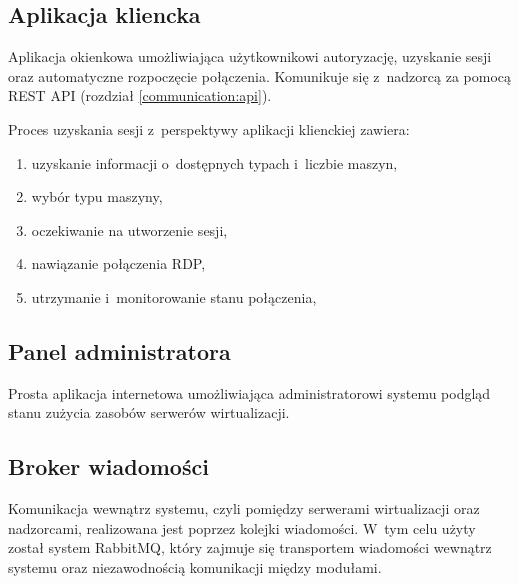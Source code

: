 \documentclass[../opis-rozwiazania.tex]{subfiles}
\begin{document}
\subsection{Aplikacja kliencka}
\label{modules:client}

Aplikacja okienkowa umożliwiająca użytkownikowi autoryzację, uzyskanie sesji oraz automatyczne rozpoczęcie połączenia. Komunikuje się z~nadzorcą za pomocą REST API (rozdział \ref{communication:api}).

Proces uzyskania sesji z~perspektywy aplikacji klienckiej zawiera:
\begin{enumerate}
  \item uzyskanie informacji o~dostępnych typach i~liczbie maszyn,
  \item wybór typu maszyny,
  \item oczekiwanie na utworzenie sesji,
  \item nawiązanie połączenia RDP,
  \item utrzymanie i~monitorowanie stanu połączenia,
\end{enumerate}

\subsection{Panel administratora}

Prosta aplikacja internetowa umożliwiająca administratorowi systemu podgląd stanu zużycia zasobów serwerów wirtualizacji.

\subsection{Broker wiadomości}
\label{modules:broker}

Komunikacja wewnątrz systemu, czyli pomiędzy serwerami wirtualizacji oraz nadzorcami, realizowana jest  poprzez kolejki wiadomości. W~tym celu użyty został system RabbitMQ, który zajmuje się transportem wiadomości wewnątrz systemu oraz niezawodnością komunikacji między modułami.
\end{document}
